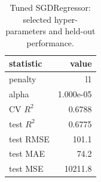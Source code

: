 \begin{table}[htbp]
\centering
\caption{Tuned SGDRegressor: selected hyper-parameters and held-out performance.}\label{tab:sgd-metrics}
\begin{tabular}{lr}
\toprule
statistic & value \\
\midrule
penalty & l1 \\
alpha & 1.000e-05 \\
CV $R^2$ & 0.6788 \\
test $R^2$ & 0.6775 \\
test RMSE & 101.1 \\
test MAE & 74.2 \\
test MSE & 10211.8 \\
\bottomrule
\end{tabular}
\end{table}

